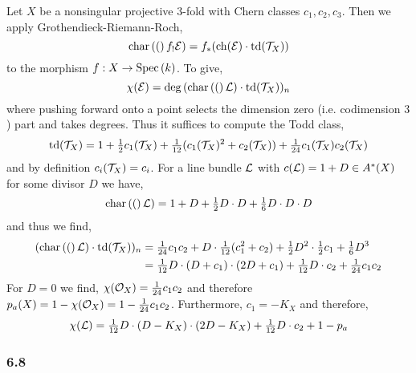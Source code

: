 \documentclass[12pt]{article}
\newcommand{\ch}[1]{\mathrm{char}\left( #1 \right)}
\begin{document}
Let $X$ be a nonsingular projective $3$-fold with Chern classes $c_1, c_2, c_3$. Then we apply Grothendieck-Riemann-Roch,
\[ \ch(f_! \E) = f_* (\mathrm{ch}(\E) \cdot \td(\T_X)) \]
to the morphism $f : X \to \mathrm{Spec}\left( k \right)$. To give,
\[ \chi(\E) = \deg{(\ch(\L) \cdot \td(\T_X))_n} \]
where pushing forward onto a point selects the dimension zero (i.e. codimension $3$) part and takes degrees.
Thus it suffices to compute the Todd class,
\[ \mathrm{td}(\mathcal{T}_X) = 1 + \tfrac{1}{2} c_1(\mathcal{T}_X) + \tfrac{1}{12} (c_1(\mathcal{T}_X)^2 + c_2(\mathcal{T}_X)) + \tfrac{1}{24} c_1(\mathcal{T}_X) c_2(\mathcal{T}_X) \]
and by definition $c_i(\mathcal{T}_X) = c_i$. For a line bundle $\mathcal{L}$ with $c(\mathcal{L}) = 1 + D \in A^*(X)$ for some divisor $D$ we have,
\[ \ch(\L) = 1 + D + \tfrac{1}{2} D \cdot D + \tfrac{1}{6} D \cdot D \cdot D \]
and thus we find,
\begin{align*}
(\ch(\L) \cdot \td(\T_X))_n & = \tfrac{1}{24} c_1 c_2 + D \cdot \tfrac{1}{12} (c_1^2 + c_2) + \tfrac{1}{2} D^2 \cdot \tfrac{1}{2} c_1 + \tfrac{1}{6} D^3 
\\
& = \tfrac{1}{12} D \cdot (D + c_1) \cdot (2 D + c_1) + \tfrac{1}{12} D \cdot c_2 + \tfrac{1}{24} c_1 c_2
\end{align*}
For $D = 0$ we find, $\chi(\mathcal{O}_{X}) = \tfrac{1}{24} c_1 c_2$
and therefore $p_a(X) = 1 - \chi(\mathcal{O}_{X}) = 1 - \tfrac{1}{24} c_1 c_2$. Furthermore, $c_1 = -K_X$ and therefore,
\[ \chi(\mathcal{L}) = \tfrac{1}{12} D \cdot (D - K_X) \cdot (2D - K_X) + \tfrac{1}{12} D \cdot c_2 + 1 - p_a \]

\subsubsection{6.8}
\end{document}
